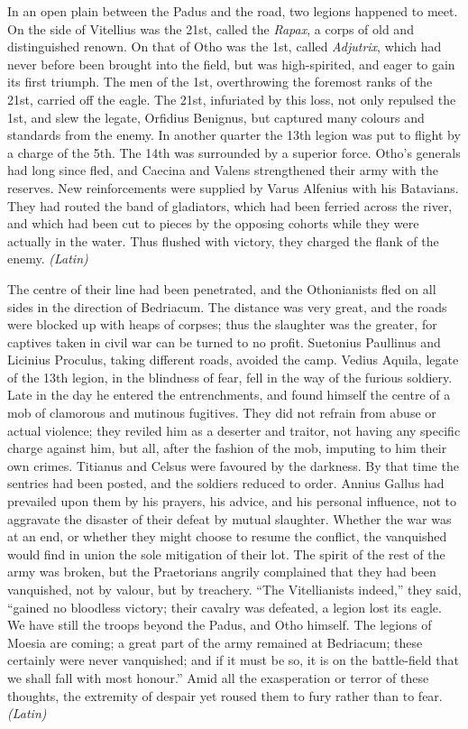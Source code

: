 
In an open plain between the Padus and the road, two legions happened to meet. On the side of Vitellius was the 21st, called the \emph{Rapax}, a corps of old and distinguished renown. On that of Otho was the 1st, called \emph{Adjutrix}, which had never before been brought into the field, but was high-spirited, and eager to gain its first triumph. The men of the 1st, overthrowing the foremost ranks of the 21st, carried off the eagle. The 21st, infuriated by this loss, not only repulsed the 1st, and slew the legate, Orfidius Benignus, but captured many colours and standards from the enemy. In another quarter the 13th legion was put to flight by a charge of the 5th. The 14th was surrounded by a superior force. Otho's generals had long since fled, and Caecina and Valens strengthened their army with the reserves. New reinforcements were supplied by Varus Alfenius with his Batavians. They had routed the band of gladiators, which had been ferried across the river, and which had been cut to pieces by the opposing cohorts while they were actually in the water. Thus flushed with victory, they charged the flank of the enemy. \emph{(Latin)}


The centre of their line had been penetrated, and the Othonianists fled on all sides in the direction of Bedriacum. The distance was very great, and the roads were blocked up with heaps of corpses; thus the slaughter was the greater, for captives taken in civil war can be turned to no profit. Suetonius Paullinus and Licinius Proculus, taking different roads, avoided the camp. Vedius Aquila, legate of the 13th legion, in the blindness of fear, fell in the way of the furious soldiery. Late in the day he entered the entrenchments, and found himself the centre of a mob of clamorous and mutinous fugitives. They did not refrain from abuse or actual violence; they reviled him as a deserter and traitor, not having any specific charge against him, but all, after the fashion of the mob, imputing to him their own crimes. Titianus and Celsus were favoured by the darkness. By that time the sentries had been posted, and the soldiers reduced to order. Annius Gallus had prevailed upon them by his prayers, his advice, and his personal influence, not to aggravate the disaster of their defeat by mutual slaughter. Whether the war was at an end, or whether they might choose to resume the conflict, the vanquished would find in union the sole mitigation of their lot. The spirit of the rest of the army was broken, but the Praetorians angrily complained that they had been vanquished, not by valour, but by treachery. ``The Vitellianists indeed,'' they said, ``gained no bloodless victory; their cavalry was defeated, a legion lost its eagle. We have still the troops beyond the Padus, and Otho himself. The legions of Moesia are coming; a great part of the army remained at Bedriacum; these certainly were never vanquished; and if it must be so, it is on the battle-field that we shall fall with most honour.'' Amid all the exasperation or terror of these thoughts, the extremity of despair yet roused them to fury rather than to fear. \emph{(Latin)}


